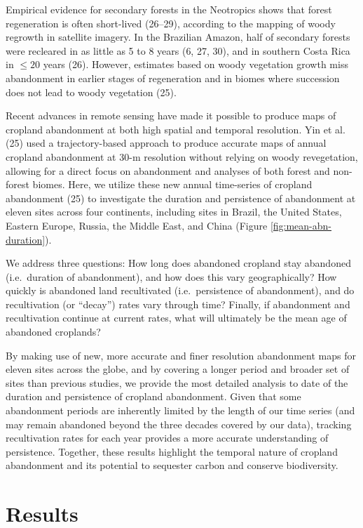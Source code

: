 \documentclass[9pt,twocolumn,twoside,]{pnas-new}
\begin{document}
Empirical evidence for secondary forests in the Neotropics shows that
forest regeneration is often short-lived (26--29), according to the
mapping of woody regrowth in satellite imagery. In the Brazilian Amazon,
half of secondary forests were recleared in as little as 5 to 8 years
(6, 27, 30), and in southern Costa Rica in \(\leq20\) years (26).
However, estimates based on woody vegetation growth miss abandonment in
earlier stages of regeneration and in biomes where succession does not
lead to woody vegetation (25).

Recent advances in remote sensing have made it possible to produce maps
of cropland abandonment at both high spatial and temporal resolution.
Yin et al. (25) used a trajectory-based approach to produce accurate
maps of annual cropland abandonment at 30-m resolution without relying
on woody revegetation, allowing for a direct focus on abandonment and
analyses of both forest and non-forest biomes. Here, we utilize these
new annual time-series of cropland abandonment (25) to investigate the
duration and persistence of abandonment at eleven sites across four
continents, including sites in Brazil, the United States, Eastern
Europe, Russia, the Middle East, and China (Figure
\ref{fig:mean-abn-duration}).

We address three questions: How long does abandoned cropland stay
abandoned (i.e.~duration of abandonment), and how does this vary
geographically? How quickly is abandoned land recultivated
(i.e.~persistence of abandonment), and do recultivation (or ``decay'')
rates vary through time? Finally, if abandonment and recultivation
continue at current rates, what will ultimately be the mean age of
abandoned croplands?

By making use of new, more accurate and finer resolution abandonment
maps for eleven sites across the globe, and by covering a longer period
and broader set of sites than previous studies, we provide the most
detailed analysis to date of the duration and persistence of cropland
abandonment. Given that some abandonment periods are inherently limited
by the length of our time series (and may remain abandoned beyond the
three decades covered by our data), tracking recultivation rates for
each year provides a more accurate understanding of persistence.
Together, these results highlight the temporal nature of cropland
abandonment and its potential to sequester carbon and conserve
biodiversity.

\hypertarget{results}{%
\section{Results}\label{results}}
\end{document}
